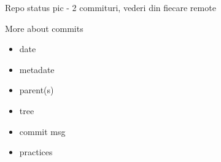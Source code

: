 \documentclass{beamer}
\begin{document}
\begin{frame}{Repo status}
pic - 2 commituri, vederi din fiecare remote
\end{frame}

\begin{frame}{More about commits}
  \begin{itemize}
    \item date
    \item metadate
    \item parent(s)
    \item tree
    \item commit msg
    \item practices
  \end{itemize}
\end{frame}

%
\end{document}
